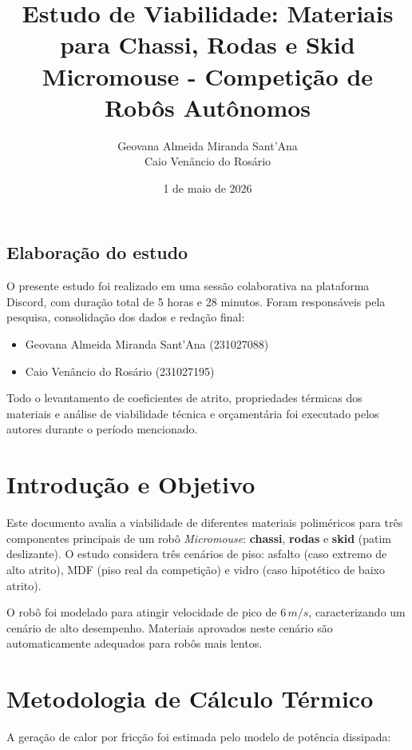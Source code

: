 \documentclass[12pt, a4paper]{article}
\title{Estudo de Viabilidade: Materiais para Chassi, Rodas e Skid \\ 
\large Micromouse - Competição de Robôs Autônomos}
\author{Geovana Almeida Miranda Sant'Ana \\ Caio Venâncio do Rosário}
\date{1 de maio de 2026}
\begin{document}
\maketitle

\newpage
\setcounter{page}{2}

\subsection*{Elaboração do estudo}

O presente estudo foi realizado em uma sessão colaborativa na plataforma Discord, com duração total de 5 horas e 28 minutos. Foram responsáveis pela pesquisa, consolidação dos dados e redação final:

\begin{itemize}
    \item Geovana Almeida Miranda Sant'Ana (231027088)
    \item Caio Venâncio do Rosário (231027195)
\end{itemize}

Todo o levantamento de coeficientes de atrito, propriedades térmicas dos materiais e análise de viabilidade técnica e orçamentária foi executado pelos autores durante o período mencionado.

\section{Introdução e Objetivo}

Este documento avalia a viabilidade de diferentes materiais poliméricos para três componentes principais de um robô \textit{Micromouse}: \textbf{chassi}, \textbf{rodas} e \textbf{skid} (patim deslizante). O estudo considera três cenários de piso: asfalto (caso extremo de alto atrito), MDF (piso real da competição) e vidro (caso hipotético de baixo atrito).

O robô foi modelado para atingir velocidade de pico de $6 \, m/s$, caracterizando um cenário de alto desempenho. Materiais aprovados neste cenário são automaticamente adequados para robôs mais lentos.

\section{Metodologia de Cálculo Térmico}

A geração de calor por fricção foi estimada pelo modelo de potência dissipada:
\end{document}
